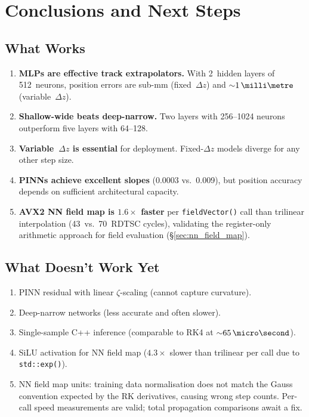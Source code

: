 \documentclass[11pt,a4paper]{article}
\newcommand{\SI}[2]{#1\,\text{#2}}
\newcommand{\num}[1]{#1}
\newcommand{\zfrac}{\zeta}
\newcommand{\dz}{\Delta z}
\begin{document}
\section{Conclusions and Next Steps}\label{sec:conclusion}

\subsection{What Works}

\begin{enumerate}[nosep]
  \item \textbf{MLPs are effective track extrapolators.}  With 2~hidden
    layers of 512~neurons, position errors are sub-mm (fixed~$\dz$) and
    ${\sim}\SI{1}{\milli\metre}$ (variable~$\dz$).
  \item \textbf{Shallow-wide beats deep-narrow.}  Two layers with
    256--1024 neurons outperform five layers with 64--128.
  \item \textbf{Variable~$\dz$ is essential} for deployment.  Fixed-$\dz$
    models diverge for any other step size.
  \item \textbf{PINNs achieve excellent slopes} (\num{0.0003} vs.\
    \num{0.009}), but position accuracy depends on sufficient architectural
    capacity.
  \item \textbf{AVX2 NN field map is $1.6\times$ faster} per
    \texttt{fieldVector()} call than trilinear interpolation
    (43~vs.~70~RDTSC cycles), validating the register-only arithmetic
    approach for field evaluation (\S\ref{sec:nn_field_map}).
\end{enumerate}

\subsection{What Doesn't Work Yet}

\begin{enumerate}[nosep]
  \item PINN residual with linear $\zfrac$-scaling (cannot capture curvature).
  \item Deep-narrow networks (less accurate and often slower).
  \item Single-sample C++ inference (comparable to RK4 at
    ${\sim}\SI{65}{\micro\second}$).
  \item SiLU activation for NN field map ($4.3\times$ slower than
    trilinear per call due to \texttt{std::exp()}).
  \item NN field map units: training data normalisation does not match
    the Gauss convention expected by the RK derivatives, causing wrong
    step counts.  Per-call speed measurements are valid; total
    propagation comparisons await a fix.
\end{enumerate}
\end{document}
